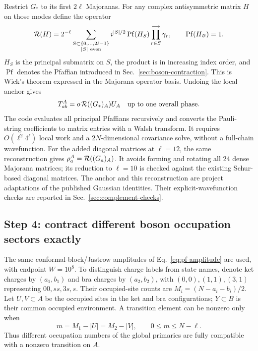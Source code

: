 Restrict $G_*$ to its first $2\ell$ Majoranas. For any complex
antisymmetric matrix $H$ on those modes define the operator
\begin{equation}
 {\cal R}(H)=2^{-\ell}
   \sum_{\substack{S\subset\{0,\ldots,2\ell-1\}\\ |S|\ {\rm even}}}
   i^{|S|/2}\operatorname{Pf}(H_S)
   \prod_{r\in S}^{\longrightarrow}\gamma_r ,
 \qquad \operatorname{Pf}(H_\varnothing)=1 .
 \label{eq:complement-wick}
\end{equation}
$H_S$ is the principal submatrix on $S$, the product is in increasing
index order, and $\operatorname{Pf}$ denotes the Pfaffian introduced in
Sec.~\ref{sec:boson-contraction}. This is Wick's theorem expressed in
the Majorana operator basis. Undoing the local anchor gives
\begin{equation}
 T_{ab}^A=o\,{\cal R}((G_*)_A)U_A
 \quad\text{up to one overall phase}.
 \label{eq:complement-ising-transition}
\end{equation}
The code evaluates all principal Pfaffians recursively and converts
the Pauli-string coefficients to matrix entries with a Walsh transform.
It requires $O(\ell^2 4^\ell)$ local work and a $2N$-dimensional
covariance solve, without a full-chain wavefunction.
For the added diagonal matrices at $\ell=12$, the same reconstruction
gives $\rho_a^A={\cal R}((G_a)_A)$. It avoids forming and rotating
all 24 dense Majorana matrices; its reduction to $\ell=10$ is checked
against the existing Schur-based diagonal matrices.
The anchor and this reconstruction are project adaptations of the
published Gaussian identities. Their explicit-wavefunction checks are
reported in Sec.~\ref{sec:complement-checks}.

\subsection{Step 4: contract different boson occupation sectors exactly}
\label{sec:complement-boson}
The same conformal-block/Jastrow amplitudes of
Eq.~\eqref{eq:pf-amplitude} are used, with endpoint $W=10^8$.
To distinguish charge labels from state names, denote ket charges by
$(a_1,b_1)$ and bra charges by $(a_2,b_2)$, with
$(0,0),(1,1),(3,1)$ representing $00,ss,3s,s$.
Their occupied-site counts are $M_i=(N-a_i-b_i)/2$.
Let $U,V\subset A$ be the occupied sites in the ket and bra configurations;
$Y\subset B$ is their common occupied environment. A transition element
can be nonzero only when
\begin{equation}
 m=M_1-|U|=M_2-|V|,\qquad 0\leq m\leq N-\ell .
 \label{eq:complement-charge-selection}
\end{equation}
Thus different occupation numbers of the global primaries are fully
compatible with a nonzero transition on $A$.

